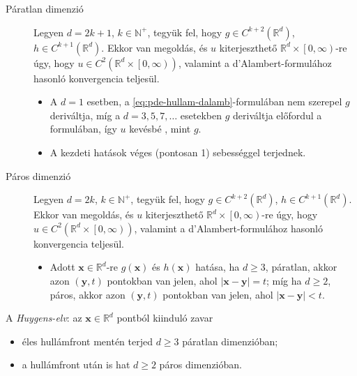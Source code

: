 \documentclass[%
	DIV=15,appendixprefix]{scrreprt}
\theoremstyle{definition}
\theoremstyle{remark}
\begin{document}
\begin{description}
	\item[Páratlan dimenzió] Legyen $ d = 2 k + 1 $, $ k \in \mathbb{ N }^{ +} $, tegyük fel, hogy
		$ g \in C^{ k + 2 } \left( \mathbb{ R }^{ d } \right) $, $ h \in C^{ k + 1 } \left(
		\mathbb{ R }^{ d } \right) $. Ekkor van megoldás, és $ u $ kiterjeszthető
		$ \mathbb{ R }^{ d } \times \left.\left[ 0,{} \infty \right)\right. $-re úgy, hogy $ u \in
		C^{ 2 } \left( \mathbb{ R }^{ d } \times \left.\left[ 0,{} \infty \right) \right.\right) $,
		valamint a d'Alambert-formulához hasonló konvergencia teljesül.
		\begin{itemize}
			\item A $ d = 1 $ esetben, a \ref{eq:pde-hullam-dalamb}-formulában nem szerepel $ g $
			deriváltja, míg a $ d = 3,{} 5,{} 7,{} \ldots $ esetekben $ g $ deriváltja előfordul a
			formulában, így $ u $ kevésbé , mint $ g $.
			\item A kezdeti hatások véges (pontosan 1) sebességgel terjednek.
		\end{itemize}
	\item[Páros dimenzió] Legyen $ d = 2 k $, $ k \in \mathbb{ N }^{ +} $, tegyük fel, hogy
		$ g \in C^{ k + 2 } \left( \mathbb{ R }^{ d } \right) $, $ h \in C^{ k + 1 } \left(
		\mathbb{ R }^{ d } \right) $. Ekkor van megoldás, és $ u $ kiterjeszthető
		$ \mathbb{ R }^{ d } \times \left.\left[ 0,{} \infty \right)\right. $-re úgy, hogy $ u \in
		C^{ 2 } \left( \mathbb{ R }^{ d } \times \left.\left[ 0,{} \infty \right) \right.\right) $,
		valamint a d'Alambert-formulához hasonló konvergencia teljesül.
		\begin{itemize}
			\item Adott $ \mathbf{ x } \in \mathbb{ R }^{ d } $-re $ g \left( \mathbf{ x } \right) $
			és $ h \left( \mathbf{ x } \right) $ hatása, ha $ d \ge 3 $, páratlan, akkor azon
			$ \left( \mathbf{y},{} t \right) $ pontokban van jelen, ahol $ \left| \mathbf{ x } -
			\mathbf{ y } \right| = t $; míg ha $ d \ge 2 $, páros, akkor azon $ \left(
			\mathbf{ y },{} t \right) $ pontokban van jelen, ahol $ \left| \mathbf{ x } -
			\mathbf{ y } \right| < t $.
		\end{itemize}
\end{description}
A \emph{Huygens-elv}: az $ \mathbf{ x } \in \mathbb{ R }^{ d } $ pontból kiinduló zavar
\begin{itemize}
	\item éles hullámfront mentén terjed $ d \ge 3 $ páratlan dimenzióban;
	\item a hullámfront után is hat $ d \ge 2 $ páros dimenzióban.
\end{itemize}
\end{document}
